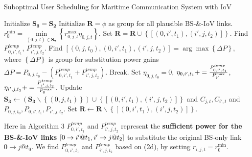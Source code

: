 \documentclass{ieeeaccess}
\begin{document}
\begin{algorithm}[!h]
\caption{Suboptimal User Scheduling for Maritime Communication System with IoV}
\label{alg:1}
\begin{algorithmic}[1]
\STATE Initialize ${{\mathbf{S}}_{\mathbf{3}}}={{\mathbf{S}}_{\mathbf{2}}}$
  \STATE Initialize ${\mathbf{R}} = \phi $ as group for all plausible BS-\&-IoV links.
  \STATE $r_0^{\min } = \mathop {\min }\limits_{\left( {0,j,t} \right) \in {{\mathbf{S}}_{\mathbf{2}}}} \left\{ {r_{0,j,t}^{\max }{\eta _{0,j,t}}} \right\}$.
            \STATE Set ${\mathbf{R = R}} \cup \left\{ {\left[ {\left( {0,i',{t_1}} \right),\left( {i',j,{t_2}} \right)} \right]} \right\}$.
          \ENDIF
        \ENDFOR
      \ENDIF
    \ENDFOR
  \ENDFOR
    \STATE Find ${P_{0,i',{t_1}}^{temp}}$, ${P_{i',j,{t_2}}^{temp}}$. 
    \STATE Find $\left[ {\left( {0,j,{t_0}} \right),\left( {0,i',{t_1}} \right),\left( {i',j,{t_2}} \right)} \right] = \arg \max \left\{ {\Delta P} \right\}$, where ${\left\{ {\Delta P} \right\}}$ is group for substitution power gains $\Delta P = {P_{0,j,{t_0}}} - \left( {{P_{0,i',{t_1}}^{temp}} + {P_{i',j,{t_2}}^{temp}}} \right)$. 
      \STATE Break.
    \ENDIF
    \STATE Set ${\eta _{0,j,{t_0}} = 0}$, ${\eta _{0,i',{t_1}}} += \frac{{{P_{0,i',{t_1}}^{{\rm{temp}}}}}}{{P_{i'}^{\max }}}$, ${\eta _{i',j,{t_2}}} += \frac{{{P_{i',j,{t_2}}^{{\rm{temp}}}}}}{{P_{0}^{\max }}}$.
    \STATE Update ${{\mathbf{S}}_{\mathbf{3}}} \leftarrow \left( {{{\mathbf{S}}_{\mathbf{3}}}\backslash \left\{ {\left( {0,j,{t_1}} \right)} \right\}} \right) \cup \left\{ {\left[ {\left( {0,i',{t_1}} \right),\left( {i',j,{t_2}} \right)} \right]} \right\}$ and ${C_{j,t}},{C_{i',t}}$ and ${P_{0,j,{t_0}}},{P_{0,i',{t_1}}},{P_{i',j,{t_2}}}$.
    \STATE Set $\mathbf{R} \leftarrow \mathbf{R}\backslash \left\{ {\left[ {\left( {0,i',{t_1}} \right),\left( {i',j,{t_2}} \right)} \right]} \right\}$.
  \ENDWHILE
\ENDFOR
\end{algorithmic}
\end{algorithm}
Here in Algorithm 3 ${P_{0,i',{t_1}}^{temp}}$ and ${P_{i',j,{t_2}}^{temp}}$ represent the \textbf{sufficient power for the  BS-\&-IoV links} $\left[ {{\rm{0}} \to i'@{t_1},i' \to j@{t_2}} \right]$ to substitute the original BS-only link $0 \to j @{t_0}$. We find ${P_{0,i',{t_1}}^{temp}}$ and ${P_{i',j,{t_2}}^{temp}}$ based on (2d), by setting ${r_{i,j,t}} = r_0^{\min }$.
\end{document}
